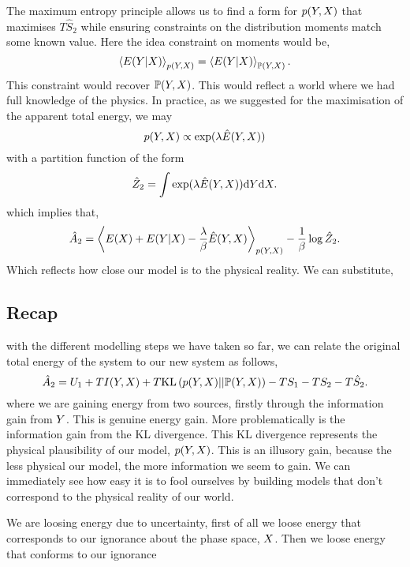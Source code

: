 \documentclass[]{article}
\begin{document}
The maximum entropy principle \cite{Jaynes-brandeis62} allows us to find a form
for \(p(Y, X)\) that maximises \(T\hat{S}_2\)
while ensuring constraints on the distribution moments match some known
value. Here the idea constraint on moments would be, \[
\left\langle E(Y | X) \right\rangle_{p(Y, X)} = \left\langle E(Y | X) \right\rangle_{\mathbb{P}(Y, X)}.
\] This constraint would recover
\(\mathbb{P}(Y, X)\). This would reflect a
world where we had full knowledge of the physics. In practice, as we
suggested for the maximisation of the apparent total energy, we may 
\[
p(Y, X) \propto \exp(\lambda \hat{E}(Y, X))
\] 
with a partition function of the form 
\[
\hat{Z}_2 = \int \exp(\lambda \hat{E}(Y , X)) \text{d} Y \text{d} X.
\] which implies that, 
\[
\hat{A}_2 = \left\langle E(X) +E(Y | X) - \frac{\lambda}{\beta}\hat{E}(Y, X) \right\rangle_{p(Y, X)} - \frac{1}{\beta} \log \hat{Z}_2.
\] 
Which reflects how close our model is to the physical reality. We can
substitute,

\subsection{Recap}\label{recap}

with the different modelling steps we have taken so far, we can relate
the original total energy of the system to our new system as follows, \[
\hat{A}_2 = U_1 + T I(Y, X) + T\text{KL}\left(p(Y, X) || \mathbb{P}(Y, X)\right) - TS_1 - TS_2 - T\hat{S}_2.
\] where we are gaining energy from two sources, firstly through the
information gain from \(Y\). This is genuine energy gain.
More problematically is the information gain from the KL divergence.
This KL divergence represents the physical plausibility of our model,
\(p(Y, X)\). This is an illusory gain,
because the less physical our model, the more information we seem to
gain. We can immediately see how easy it is to fool ourselves by
building models that don't correspond to the physical reality of our
world.

We are loosing energy due to uncertainty, first of all we loose energy
that corresponds to our ignorance about the phase space,
\(X\). Then we loose energy that conforms to our ignorance
\end{document}
